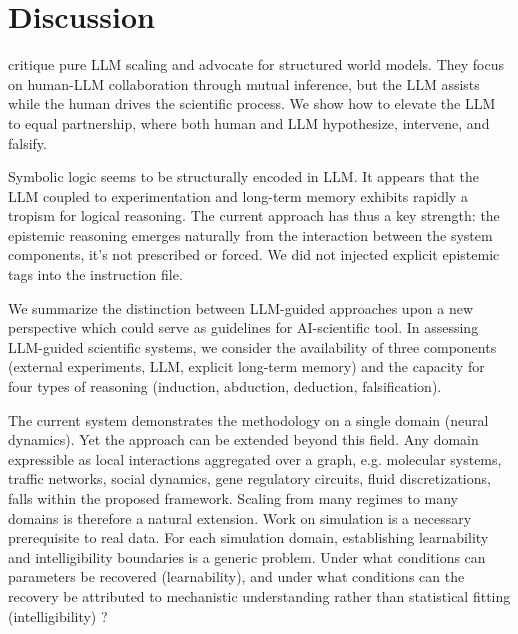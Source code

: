 \documentclass[10pt,twocolumn]{article}
\begin{document}
\section{Discussion}

\citep{collins_building_2024} critique pure LLM scaling and advocate for structured world models. They focus on human-LLM collaboration through mutual inference, but the LLM assists while the human drives the scientific process. We show how to elevate the LLM to equal partnership, where both human and LLM hypothesize, intervene, and falsify.

Symbolic logic seems to be structurally encoded in LLM. It appears that the LLM coupled to experimentation and long-term memory exhibits rapidly a tropism for logical reasoning. The current approach has thus a key strength: the epistemic reasoning emerges naturally from the interaction between the system components, it's not prescribed or forced. We did not injected explicit epistemic tags into the instruction file.  

We summarize the distinction between LLM-guided approaches upon a new perspective which could serve as guidelines for AI-scientific tool. In assessing LLM-guided scientific systems, we consider the availability of three components (external experiments, LLM, explicit long-term memory) and the capacity for four types of reasoning (induction, abduction, deduction, falsification).

The current system demonstrates the methodology on a single domain (neural dynamics). Yet the approach can be extended beyond this field. Any domain expressible as local interactions aggregated over a graph, e.g. molecular systems, traffic networks, social dynamics, gene regulatory circuits, fluid discretizations, falls within the proposed framework. Scaling from many regimes to many domains is therefore a natural extension. Work on simulation is a necessary prerequisite to real data. For each simulation domain, establishing learnability and intelligibility boundaries is a generic problem. Under what conditions can parameters be recovered (learnability), and under what conditions can the recovery be attributed to mechanistic understanding rather than statistical fitting (intelligibility) ? 

\end{document}
